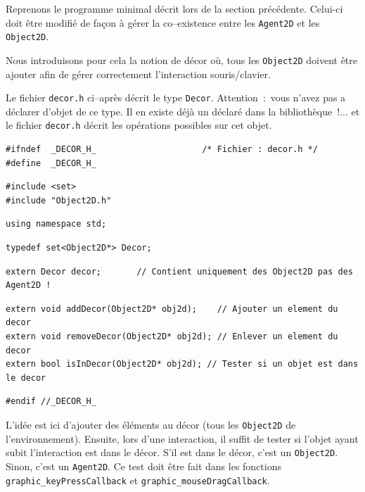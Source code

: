 \documentclass[12pt]{article}
\begin{document}
\vspace{0.2cm}
Reprenons le programme minimal d\'ecrit lors de la section
pr\'ec\'edente. Celui-ci doit \^etre modifi\'e de fa\c con 
\`a g\'erer la co--existence entre les {\tt Agent2D} et
les {\tt Object2D}.

\vspace{0.2cm}
Nous introduisons pour cela la notion de d\'ecor o\`u,
tous les {\tt Object2D} doivent \^etre ajouter afin de
g\'erer correctement l'interaction souris/clavier.

\vspace{0.2cm}
Le fichier {\tt decor.h} ci--apr\`es
d\'ecrit le type {\tt Decor}.
Attention~:~vous n'avez pas a d\'eclarer d'objet
de ce type.
Il en existe d\'ej\`a un d\'eclar\'e dans la biblioth\`eque~!...
et le fichier {\tt decor.h} d\'ecrit les op\'erations
possibles sur cet objet.

\begin{small}
\begin{verbatim}
#ifndef  _DECOR_H_                     /* Fichier : decor.h */
#define  _DECOR_H_
\end{verbatim}
\begin{verbatim}
#include <set>
#include "Object2D.h"
\end{verbatim}
\begin{verbatim}
using namespace std;
\end{verbatim}
\begin{verbatim}
typedef set<Object2D*> Decor;
\end{verbatim}
\begin{verbatim}
extern Decor decor;       // Contient uniquement des Object2D pas des Agent2D !
\end{verbatim}
\begin{verbatim}
extern void addDecor(Object2D* obj2d);    // Ajouter un element du decor
extern void removeDecor(Object2D* obj2d); // Enlever un element du decor
extern bool isInDecor(Object2D* obj2d); // Tester si un objet est dans le decor
\end{verbatim}
\begin{verbatim}
#endif //_DECOR_H_
\end{verbatim}
\end{small}

\newpage
L'id\'ee est ici d'ajouter des \'el\'ements au d\'ecor
(tous les {\tt Object2D} de l'environnement).
Ensuite, lors d'une interaction,
il suffit de tester si l'objet ayant subit l'interaction est dans le d\'ecor.
S'il est dans le d\'ecor, c'est un {\tt Object2D}. Sinon,
c'est un {\tt Agent2D}.
Ce test doit \^etre fait dans les fonctions
{\tt graphic\_keyPressCallback} et {\tt graphic\_mouseDragCallback}.
\end{document}
